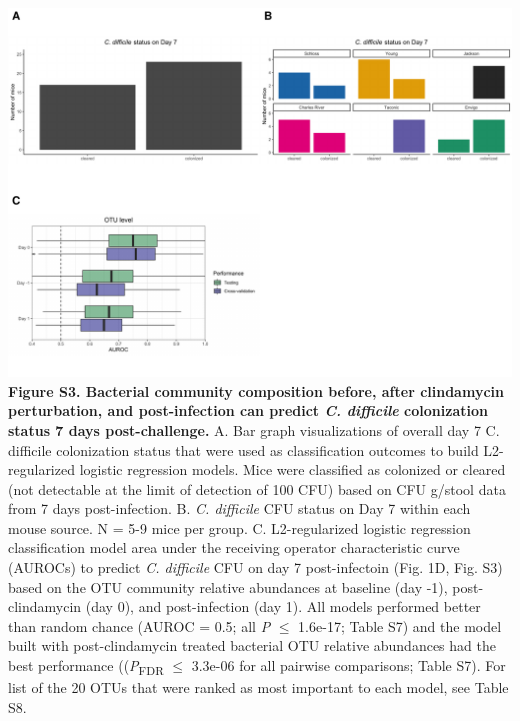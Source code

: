 \documentclass[11pt,]{article}
\begin{document}
\includegraphics{figure_S3.pdf} \textbf{Figure S3. Bacterial community
composition before, after clindamycin perturbation, and post-infection
can predict \emph{C. difficile} colonization status 7 days
post-challenge.} A. Bar graph visualizations of overall day 7 C.
difficile colonization status that were used as classification outcomes
to build L2-regularized logistic regression models. Mice were classified
as colonized or cleared (not detectable at the limit of detection of 100
CFU) based on CFU g/stool data from 7 days post-infection. B. \emph{C.
difficile} CFU status on Day 7 within each mouse source. N = 5-9 mice
per group. C. L2-regularized logistic regression classification model
area under the receiving operator characteristic curve (AUROCs) to
predict \emph{C. difficile} CFU on day 7 post-infectoin (Fig. 1D, Fig.
S3) based on the OTU community relative abundances at baseline (day -1),
post-clindamycin (day 0), and post-infection (day 1). All models
performed better than random chance (AUROC = 0.5; all \emph{P} \(\le\)
1.6e-17; Table S7) and the model built with post-clindamycin treated
bacterial OTU relative abundances had the best performance
((\emph{P}\textsubscript{FDR} \(\le\) 3.3e-06 for all pairwise
comparisons; Table S7). For list of the 20 OTUs that were ranked as most
important to each model, see Table S8.

\newpage
\end{document}
